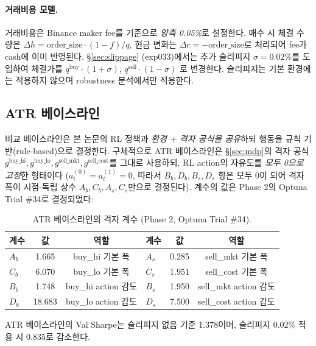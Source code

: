 \documentclass[11pt, a4paper]{article}
\begin{document}
\paragraph{거래비용 모델.}
거래비용은 Binance maker fee를 기준으로 \emph{양측 0.05\%}로 설정한다. 매수 시
체결 수량은 $\Delta h = \text{order\_size} \cdot (1 - f) / q$, 현금 변화는
$\Delta c = -\text{order\_size}$로 처리되어 fee가 cash에 이미 반영된다.
\S\ref{sec:slippage} (exp033)에서는 추가 슬리피지 $\sigma = 0.02\%$를 도입하여
체결가를 $q^{\mathrm{buy}} \cdot (1 + \sigma)$, $q^{\mathrm{sell}} \cdot (1 - \sigma)$
로 변경한다. 슬리피지는 기본 환경에는 적용하지 않으며 robustness 분석에서만
적용한다.

\subsection{ATR 베이스라인}
\label{sec:atr_baseline}

비교 베이스라인은 본 논문의 RL 정책과 \emph{환경 + 격자 공식을 공유}하되 행동을
규칙 기반(rule-based)으로 결정한다. 구체적으로 ATR 베이스라인은 \S\ref{sec:mdp}의
격자 공식 $g^{\mathrm{buy\_hi}}, g^{\mathrm{buy\_lo}}, g^{\mathrm{sell\_mkt}},
g^{\mathrm{sell\_cost}}$를 그대로 사용하되, RL action의 자유도를 \emph{모두 0으로
고정}한 형태이다 ($a_t^{(0)} = a_t^{(1)} = 0$, 따라서 $B_b, D_b, B_s, D_s$ 항은
모두 0이 되어 격자 폭이 시점-독립 상수 $A_b, C_b, A_s, C_s$만으로 결정된다). 계수의
값은 Phase 2의 Optuna Trial \#34로 결정되었다:

\begin{table}[!htbp]
\centering
\caption{ATR 베이스라인의 격자 계수 (Phase 2, Optuna Trial \#34).}
\begin{tabular}{lcclcc}
\toprule
계수 & 값 & 역할 & 계수 & 값 & 역할 \\
\midrule
$A_b$ & 1.665 & buy\_hi 기본 폭 & $A_s$ & 0.285 & sell\_mkt 기본 폭 \\
$C_b$ & 6.070 & buy\_lo 기본 폭 & $C_s$ & 1.951 & sell\_cost 기본 폭 \\
$B_b$ & 1.748 & buy\_hi action 감도 & $B_s$ & 1.950 & sell\_mkt action 감도 \\
$D_b$ & 18.683 & buy\_lo action 감도 & $D_s$ & 7.500 & sell\_cost action 감도 \\
\bottomrule
\end{tabular}
\label{tab:atr_coefs}
\end{table}

ATR 베이스라인의 Val Sharpe는 슬리피지 없음 기준 1.378이며, 슬리피지 0.02\%
적용 시 0.835로 감소한다.
\end{document}
